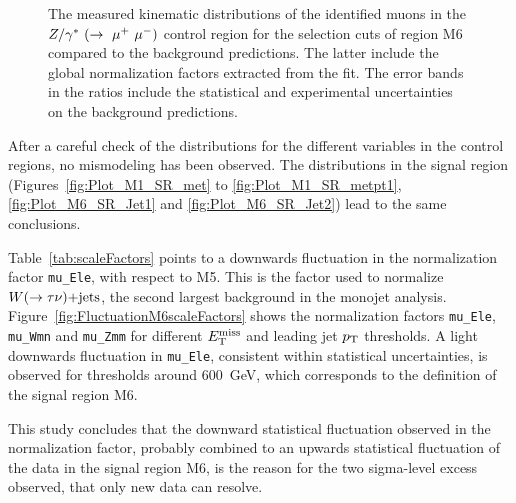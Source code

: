 \begin{figure}[!ht]
\begin{center}
{    }
  \end{center}
  \caption[Kinematic distributions of the identified muons in the $Z/\gamma^{\ast}(\rightarrow \mu^{+}\mu^{-})$+jets control region for the selection cuts of region M6, after the normalization factors extracted from the fit have been applied.]{The measured kinematic distributions of the identified muons in the $Z/\gamma^*~(\rightarrow~\mu^+~\mu^-)$ control region for the selection cuts of region M6 compared to the background predictions. The latter include the global normalization factors extracted from the fit. The error bands in the ratios include the statistical and experimental uncertainties on the background predictions.}
  \label{fig:Plot_M6_CRzmm_Leptonkinematics}
\end{figure}

After a careful check of the distributions for the different variables in the control regions, no mismodeling has been observed.
The distributions in the signal region (Figures~\ref{fig:Plot_M1_SR_met} to \ref{fig:Plot_M1_SR_metpt1}, \ref{fig:Plot_M6_SR_Jet1} and \ref{fig:Plot_M6_SR_Jet2}) lead to the same conclusions.

Table~\ref{tab:scaleFactors} points to a downwards fluctuation in the normalization factor \texttt{mu\_Ele}, with respect to M5.
This is the factor used to normalize $W(\rightarrow \tau \nu)\text{+jets}$, the second largest background in the monojet analysis.
Figure~\ref{fig:FluctuationM6scaleFactors} shows the normalization factors \texttt{mu\_Ele}, \texttt{mu\_Wmn} and \texttt{mu\_Zmm} for different $E_{\mathrm{T}}^{\mathrm{miss}}$ and leading jet $p_{\mathrm{T}}$ thresholds.
A light downwards fluctuation in \texttt{mu\_Ele}, consistent within statistical uncertainties, is observed for thresholds around 600~GeV, which corresponds to the definition of the signal region M6.

This study concludes that the downward statistical fluctuation observed in the normalization factor, probably combined to an upwards statistical fluctuation of the data in the signal region M6, is the reason for the two sigma-level excess observed, that only new data can resolve.

